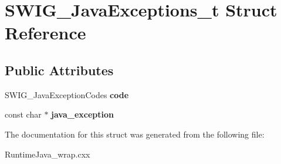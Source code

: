 \hypertarget{struct_s_w_i_g___java_exceptions__t}{}\section{S\+W\+I\+G\+\_\+\+Java\+Exceptions\+\_\+t Struct Reference}
\label{struct_s_w_i_g___java_exceptions__t}
\subsection*{Public Attributes}
\begin{DoxyCompactItemize}
\item 
S\+W\+I\+G\+\_\+\+Java\+Exception\+Codes {\bfseries code}\hypertarget{struct_s_w_i_g___java_exceptions__t_a04044dfc89f07ed39fe7bbb23f120d5a}{}\label{struct_s_w_i_g___java_exceptions__t_a04044dfc89f07ed39fe7bbb23f120d5a}

\item 
const char $\ast$ {\bfseries java\+\_\+exception}\hypertarget{struct_s_w_i_g___java_exceptions__t_a38dd5a9090f6d6c09f43d85536bc3154}{}\label{struct_s_w_i_g___java_exceptions__t_a38dd5a9090f6d6c09f43d85536bc3154}

\end{DoxyCompactItemize}


The documentation for this struct was generated from the following file\+:\begin{DoxyCompactItemize}
\item 
Runtime\+Java\+\_\+wrap.\+cxx\end{DoxyCompactItemize}
